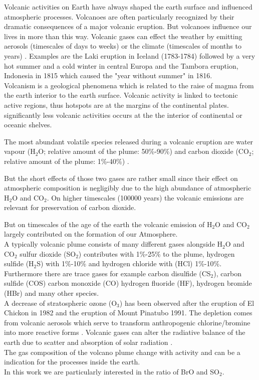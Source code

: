 
Volcanic activities on Earth have always shaped the earth surface and influenced atmospheric processes. Volcanoes are often particularly recognized by their dramatic consequences of a major volcanic eruption. But volcanoes influence our lives in more than this way. Volcanic gases can effect the weather by emitting aerosols (timescales of days to weeks) or the climate (timescales of months to years) \cite{schmidt2015volcanismarticle}.
Examples are the Laki eruption in Iceland (1783-1784) followed by a very hot summer and a cold winter in central Europa \cite{thordarson2003atmospheric} and the Tambora eruption, Indonesia in 1815 which caused the "year without summer" in 1816.\\
%
\newline
%
Volcanism is a geological phenomena which is related to the raise of magma  from the earth interior to the earth surface. Volcanic activity is linked to tectonic active regions, thus hotspots are at the margins of the continental plates.
significantly less volcanic activities occurs at the the interior of continental or oceanic shelves. \cite{schmincke2000vulkanismus}

The most abundant volatile species released during a volcanic eruption are water vapour (H$_2$O; relative amount of the plume: 50\%-90\%) and carbon dioxide (CO$_2$; relative amount of the plume: 1\%-40\%) \cite{platt2015quantification}. 

But the short effects of those two gases are rather small since their effect on atmospheric composition is negligibly due to the high abundance of atmospheric H$_2$O and CO$_2$. 
On higher timescales (100000 years) the volcanic emissions are relevant for preservation of carbon dioxide. 

But on timescales of the age of the earth the volcanic emission of H$_2$O and CO$_2$ largely contributed on the formation of our Atmosphere. \cite{schmidt2015volcanism}\\ 

A typically volcanic plume consists of many different gases alongside H$_2$O and CO$_2$  sulfur dioxide (SO$_2$) contributes with 1\%-25\% to the plume, hydrogen sulfide (H$_2$S) with 1\%-10\% and hydrogen chloride with (HCl) 1\%-10\%. Furthermore there are trace gases for example carbon disulfide (CS$_2$), carbon sulfide (COS) carbon monoxide (CO) hydrogen fluoride (HF), hydrogen bromide (HBr) and many other species. \cite{platt2015quantification}\\
%
A decrease of stratospheric ozone (O$_3$) has been observed after the eruption of  El Chickon in 1982 and the eruption of Mount Pinatubo 1991. The depletion comes from volcanic aerosols which serve to transform anthropogenic chlorine/bromine into more reactive forms \cite{solomon1998ozone}. 
%
Volcanic gases can alter the radiative balance of the earth due to scatter and absorption of solar radiation \cite{schmidt2015volcanism}.\\
%
The gas composition of the volcano plume change with activity and can be a indication for the processes inside the earth.\\ 
%
In this work we are particularly interested in the ratio of BrO and SO$_2$.
 
